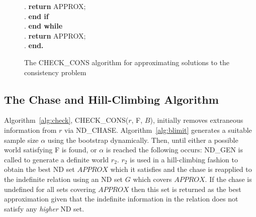 {\begin{figure}[ht]
\begin{center}
{\begin{minipage}{16cm}
\begin{algorithm}
\begin{rm}
\begin{tabbing}
\sa. \> \> \> \> \> {\bf return} APPROX; \\
\sa. \> \> \> \> {\bf end if} \\
\sa. \> \> \>  {\bf end while} \\
\sa. \> \> \> {\bf return} APPROX; \\
\sa. \> \> {\bf end.}
\end{tabbing}
\end{rm}
\end{algorithm}
\end{minipage}}
\caption{\label{cp:fig:check_cons} The CHECK\_CONS algorithm for
approximating solutions to the consistency problem}
\end{center}
\end{figure}
}



\subsection{The Chase and Hill-Climbing Algorithm}

Algorithm~\ref{alg:check}, CHECK\_CONS($r$, F, $B$), initially removes
extraneous information from $r$ via
ND\_CHASE. Algorithm~\ref{alg:blimit} generates a suitable sample size
$\alpha$ using the bootstrap dynamically. Then, until either a
possible world satisfying F is found, or $\alpha$ is reached the
following occurs: ND\_GEN is called to generate a definite world
$r_2$. $r_2$ is used in a hill-climbing fashion to obtain the best ND
set $APPROX$ which it satisfies and the chase is reapplied to the indefinite
relation using an ND set $G$ which covers $APPROX$. If the chase is
undefined for all sets covering $APPROX$ then this set is returned as
the best approximation given that the indefinite information in the
relation does not satisfy any {\em higher} ND set. 

\medskip

